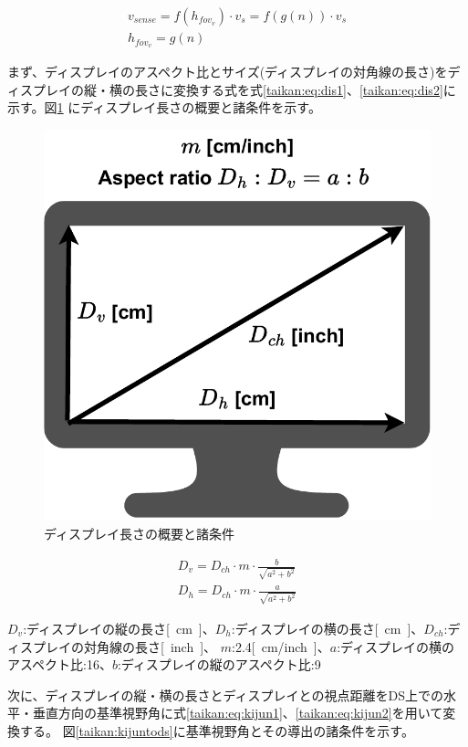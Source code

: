 \begin{align}
  v_{sense} = f(h_{fov_v})\cdot v_s = f(g(n))\cdot v_s \label{taikan:eq:model1}\\
  h_{fov_v} = g(n) \label{taikan:eq:model2}
\end{align}

まず、ディスプレイのアスペクト比とサイズ(ディスプレイの対角線の長さ)をディスプレイの縦・横の長さに変換する式を式\eqref{taikan:eq:dis1}、\eqref{taikan:eq:dis2}に示す。図\ref{taikan:displaytosize}
にディスプレイ長さの概要と諸条件を示す。

\begin{figure}[h]
  \begin{center}
  \includegraphics[width=.65\linewidth]{img/12.pdf}
  \caption{ディスプレイ長さの概要と諸条件}
  \label{taikan:displaytosize}
  \end{center}
\end{figure}

\begin{align}
    D_v = D_{ch} \cdot m \cdot \frac{b}{\sqrt{a^2+b^2}} \label{taikan:eq:dis1}\\
    D_h = D_{ch} \cdot m \cdot \frac{a}{\sqrt{a^2+b^2}} \label{taikan:eq:dis2}
\end{align}

$D_v$:ディスプレイの縦の長さ\si{[cm]}、$D_h$:ディスプレイの横の長さ\si{[cm]}、$D_{ch}$:ディスプレイの対角線の長さ\si{[inch]}、
$m$:2.4\si{[cm/inch]}、$a$:ディスプレイの横のアスペクト比:16、$b$:ディスプレイの縦のアスペクト比:9

次に、ディスプレイの縦・横の長さとディスプレイとの視点距離をDS上での水平・垂直方向の基準視野角に式\eqref{taikan:eq:kijun1}、\eqref{taikan:eq:kijun2}を用いて変換する。
図\ref{taikan:kijuntods}に基準視野角とその導出の諸条件を示す。


